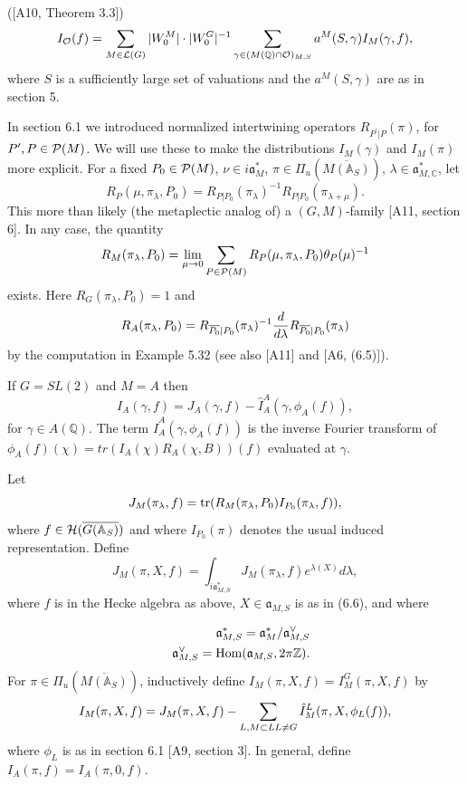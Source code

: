 \begin{proposition}
([A10, Theorem 3.3]) 
\[
I_{{\cal{O}}}(f)
=\sum_{M\in {\cal{L}}(G)}|W_0^M|\cdot |W_0^G|^{-1}
\sum_{\gamma \in (M({\mathbb{Q}})\cap {\cal{O}})_{M,S}}
a^M(S,\gamma )I_M(\gamma ,f),
\]
where $S$ is a sufficiently large set of valuations and the
$a^M(S,\gamma)$ are as in section 5.
\end{proposition}

In section 6.1 we introduced normalized intertwining operators
$R_{P^{\prime}|P}(\pi)$, for $P^{\prime},P\in {\cal P}(M)$.
We will use these to make the distributions
$I_M(\gamma)$ and $I_M(\pi)$ more explicit.
For a fixed $P_0\in {\cal P}(M)$,
$\nu\in i{\mathfrak{a}}_M^*$,
$\pi\in \Pi_u(\overline{M({\mathbb{A}}_S)})$,
$\lambda\in {\mathfrak{a}}_{M,{\mathbb{C}}}^*$, let
\begin{equation}
R_P(\mu,\pi_\lambda,P_0)
=R_{P|P_0}(\pi_\lambda)^{-1}R_{P|P_0}(\pi_{\lambda+\mu}) .
\end{equation}
This more than likely (the metaplectic analog of) a
$(G,M)$-family [A11, section 6]. In any case, the quantity
\[
R_M(\pi_\lambda,P_0)
=\lim_{\mu\rightarrow 0}
\sum_{P\in {\cal P}(M)}
R_P(\mu,\pi_\lambda,P_0)\theta_P(\mu)^{-1}
\]
exists. Here $R_G(\pi_\lambda,P_0)=1$ and
\[
R_A(\pi_\lambda,P_0)=
R_{\overline{P_0}|P_0}(\pi_\lambda)^{-1}
{d\over d\lambda}
R_{\overline{P_0}|P_0}(\pi_\lambda)
\]
by the computation in Example 5.32 (see also [A11] and [A6, (6.5)]).

\begin{example}
If $G=SL(2)$ and $M=A$ then
\[
I_A(\gamma,f)
=J_A(\gamma,f)-
\hat{I}_A^A(\gamma,\phi_A(f)),
\]
for $\gamma\in A({\mathbb{Q}})$.
The term $\hat{I}_A^A(\gamma,\phi_A(f))$
is the inverse Fourier transform of
$\phi_A(f)(\chi)=tr(I_A(\chi)R_A(\chi,B))(f)$ evaluated at
$\gamma$. 
\end{example}

Let
\begin{equation}
J_M(\pi_\lambda,f)=
{\rm tr}(R_M(\pi_\lambda,P_0)
I_{P_0}(\pi_\lambda,f)),
\end{equation}
where $f\in {\cal{H}}(\overline{G({\mathbb{A}}_S)})$ and where
$I_{P_0}(\pi)$ denotes the usual induced representation.
Define
\begin{equation}
J_M(\pi,X,f)
=\int_{i{\mathfrak{a}}^*_{M,S}}
J_M(\pi_\lambda,f)e^{\lambda(X)}d\lambda,
\end{equation}
where $f$ is in the Hecke algebra as above, $X\in {\mathfrak{a}}_{M,S}$
is as in (6.6), and where

\begin{eqnarray*}
&&{\mathfrak{a}}^*_{M,S}
={\mathfrak{a}}^*_{M}/{\mathfrak{a}}^{\vee}_{M,S}\\
&&{\mathfrak{a}}^{\vee}_{M,S}={\rm Hom}({\mathfrak{a}}_{M,S},2\pi {\mathbb Z}).
\end{eqnarray*}
For
$\pi\in \Pi_u(\overline{M({\mathbb{A}}_S)})$,
inductively define $I_M(\pi,X,f)=I_M^G(\pi,X,f)$ by
\begin{equation}
I_M(\pi,X,f)
=J_M(\pi,X,f)-
\sum_{ L, M\subset L\\ L\not= G}
\hat{I}_M^L(\pi,X,\phi_L(f)),
\end{equation}
where $\phi_L$ is as in section 6.1 [A9, section 3].
In general, define $I_A(\pi,f)=I_A(\pi,0,f)$.

